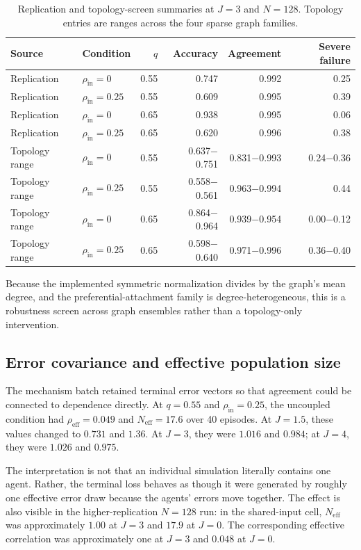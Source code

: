 \documentclass[11pt,a4paper]{article}
\begin{document}
\begin{table}[htbp]
\centering
\caption{Replication and topology-screen summaries at $J=3$ and $N=128$. Topology entries are ranges across the four sparse graph families.}
\label{tab:robustness}
\small
\begin{tabular}{@{}llrrrr@{}}
\toprule
Source & Condition & $q$ & Accuracy & Agreement & Severe failure \\
\midrule
Replication & $\rho_{\mathrm{in}}=0$ & 0.55 & 0.747 & 0.992 & 0.25 \\
Replication & $\rho_{\mathrm{in}}=0.25$ & 0.55 & 0.609 & 0.995 & 0.39 \\
Replication & $\rho_{\mathrm{in}}=0$ & 0.65 & 0.938 & 0.995 & 0.06 \\
Replication & $\rho_{\mathrm{in}}=0.25$ & 0.65 & 0.620 & 0.996 & 0.38 \\
Topology range & $\rho_{\mathrm{in}}=0$ & 0.55 & 0.637$-$0.751 & 0.831$-$0.993 & 0.24$-$0.36 \\
Topology range & $\rho_{\mathrm{in}}=0.25$ & 0.55 & 0.558$-$0.561 & 0.963$-$0.994 & 0.44 \\
Topology range & $\rho_{\mathrm{in}}=0$ & 0.65 & 0.864$-$0.964 & 0.939$-$0.954 & 0.00$-$0.12 \\
Topology range & $\rho_{\mathrm{in}}=0.25$ & 0.65 & 0.598$-$0.640 & 0.971$-$0.996 & 0.36$-$0.40 \\
\bottomrule
\end{tabular}
\end{table}

Because the implemented symmetric normalization divides by the graph's mean degree, and the preferential-attachment family is degree-heterogeneous, this is a robustness screen across graph ensembles rather than a topology-only intervention.

\subsection{Error covariance and effective population size}

The mechanism batch retained terminal error vectors so that agreement could be connected to dependence directly. At $q=0.55$ and $\rho_{\mathrm{in}}=0.25$, the uncoupled condition had $\rho_{\mathrm{eff}}=0.049$ and $N_{\mathrm{eff}}=17.6$ over 40 episodes. At $J=1.5$, these values changed to $0.731$ and $1.36$. At $J=3$, they were $1.016$ and $0.984$; at $J=4$, they were $1.026$ and $0.975$.

The interpretation is not that an individual simulation literally contains one agent. Rather, the terminal loss behaves as though it were generated by roughly one effective error draw because the agents' errors move together. The effect is also visible in the higher-replication $N=128$ run: in the shared-input cell, $N_{\mathrm{eff}}$ was approximately $1.00$ at $J=3$ and $17.9$ at $J=0$. The corresponding effective correlation was approximately one at $J=3$ and $0.048$ at $J=0$.
\end{document}
